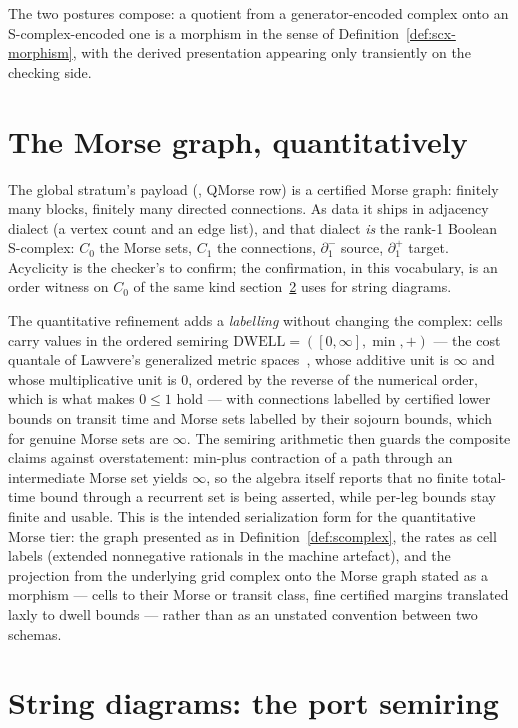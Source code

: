 The two postures compose: a quotient from a generator-encoded complex
onto an S-complex-encoded one is a morphism in the sense of
Definition~\ref{def:scx-morphism}, with the derived presentation
appearing only transiently on the checking side.

\section{The Morse graph, quantitatively}
\label{sec:scx-morse}

The global stratum's payload
(, QMorse row) is
a certified Morse graph: finitely many blocks, finitely many directed
connections. As data it ships in adjacency dialect (a vertex count
and an edge list), and that dialect \emph{is} the rank-1 Boolean
S-complex: $C_0$ the Morse sets, $C_1$ the connections,
$\partial_1^{-}$ source, $\partial_1^{+}$ target. Acyclicity is the
checker's to confirm; the confirmation, in this vocabulary, is an
order witness on $C_0$ of the same kind
section~\ref{sec:scx-strings} uses for string diagrams.

The quantitative refinement adds a \emph{labelling} without changing
the complex: cells carry values in the ordered semiring
$\mathrm{DWELL} = ([0, \infty], \min, +)$ --- the cost quantale of
Lawvere's generalized metric spaces~\cite{lawvere73}, whose additive
unit is $\infty$ and whose multiplicative unit is $0$, ordered by
the reverse of the numerical order, which is what makes $0 \le 1$
hold --- with
connections labelled by certified lower bounds on transit time and
Morse sets labelled by their sojourn bounds, which for genuine Morse
sets are $\infty$. The semiring arithmetic then guards the composite
claims against overstatement: min-plus contraction of a path through
an intermediate Morse set yields $\infty$, so the algebra itself
reports that no finite total-time bound through a recurrent set is
being asserted, while per-leg bounds stay finite and usable. This is
the intended serialization form for the quantitative Morse tier: the
graph presented as in Definition~\ref{def:scomplex}, the rates as
cell labels (extended nonnegative rationals in the machine
artefact), and the projection from the underlying grid complex
onto the Morse graph stated as a morphism --- cells to their Morse
or transit class, fine certified margins translated laxly to dwell
bounds --- rather than as an unstated convention between two
schemas.

\section{String diagrams: the port semiring}
\label{sec:scx-strings}

